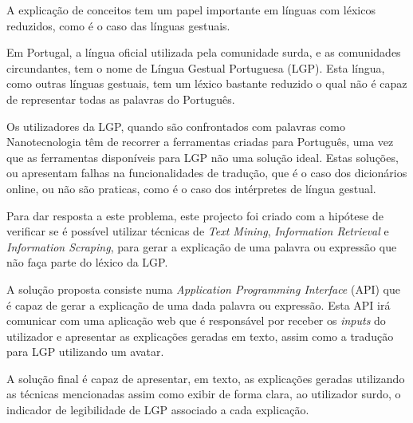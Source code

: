 \begin{abstractotherlanguage}
   A explicação de conceitos tem um papel importante em línguas com léxicos reduzidos, como é o caso das línguas gestuais.

    Em Portugal, a língua oficial utilizada pela comunidade surda, e as comunidades circundantes, tem o nome de Língua Gestual Portuguesa (LGP).
    Esta língua, como outras línguas gestuais, tem um léxico bastante reduzido o qual não é capaz de representar todas as palavras do Português.

    Os utilizadores da LGP, quando são confrontados com palavras como Nanotecnologia têm de recorrer a ferramentas criadas para Português, uma vez que as ferramentas disponíveis para LGP não uma solução ideal.
    Estas soluções, ou apresentam falhas na funcionalidades de tradução, que é o caso dos dicionários online, ou não são praticas, como é o caso dos intérpretes de língua gestual.

    Para dar resposta a este problema, este projecto foi criado com a hipótese de verificar se é possível utilizar técnicas de \textit{Text Mining}, \textit{Information Retrieval} e \textit{Information Scraping}, para gerar a explicação de uma palavra ou expressão que não faça parte do léxico da LGP.

    A solução proposta consiste numa \textit{Application Programming Interface} (API) que é capaz de gerar a explicação de uma dada palavra ou expressão.
    Esta API irá comunicar com uma aplicação web que é responsável por receber os \textit{inputs} do utilizador e apresentar as explicações geradas em texto, assim como a tradução para LGP utilizando um avatar.

    A solução final é capaz de apresentar, em texto, as explicações geradas utilizando as técnicas mencionadas assim como exibir de forma clara, ao utilizador surdo, o indicador de legibilidade de LGP associado a cada explicação.

\end{abstractotherlanguage}


